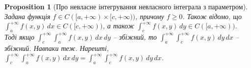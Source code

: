 \documentclass[a4paper, 10pt]{article}
\def\huge{\displaystyle}
\theoremstyle{theoremdd}
\theoremstyle{theoremdd}
\theoremstyle{theoremdd}
\theoremstyle{theoremdd}
\theoremstyle{theoremdd}
\theoremstyle{theoremdd}
\newtheorem{proposition}[theorem]{Proposition}
\theoremstyle{theoremdd}
\theoremstyle{theoremdd}
\theoremstyle{theoremdd}
\begin{document}
\begin{proposition}[Про невласне інтегрування невласного інтеграла з параметром]

Задана функція $f \in C([a,+\infty) \times [c,+\infty))$, причому $f \geq 0$. Також відомо, що $\huge\int_a^{+\infty} f(x,y)\,dx \in C([c,+\infty))$, а також $\huge\int_c^{+\infty} f(x,y)\,dy \in C([a,+\infty))$. Тоді якщо $\huge\int_c^{+\infty} \int_a^{+\infty} f(x,y)\,dx\,dy$ -- збіжний, то $\huge\int_a^{+\infty} \int_c^{+\infty} f(x,y)\,dy\,dx$ -- збіжний. Навпаки теж. Нарешті,\\
$\huge\int_c^{+\infty} \int_a^{+\infty} f(x,y)\,dx\,dy = \huge\int_a^{+\infty} \int_c^{+\infty} f(x,y)\,dy\,dx$.
\end{proposition}
\end{document}
